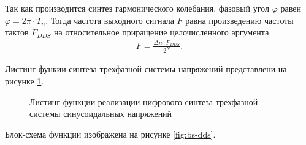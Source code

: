         Так как производится синтез гармонического колебания, фазовый угол
        $\varphi$ равен $\varphi = 2\pi \cdot T_n$. Тогда частота выходного
        сигнала $F$ равна произведению частоты тактов $F_{DDS}$ на относительное
        приращение целочисленного аргумента
        \begin{gather*}
            F = \frac{\Delta n \cdot F_{DDS}}{2^N}.
        \end{gather*}

        Листинг функии синтеза трехфазной системы напряжений представлени на
        рисунке \ref{fig:listing-sinegen}.

        \begin{figure}[h!]
            \caption{Листинг функции реализации цифрового синтеза трехфазной
                системы синусоидальных напряжений}
            \label{fig:listing-sinegen}
        \end{figure}
%
%         
%
%
%
%
%
        Блок-схема функции изображена на рисунке \ref{fig:bs-dds}.

